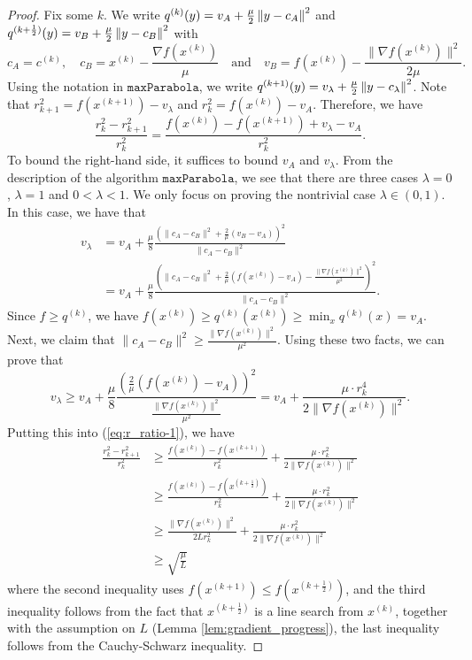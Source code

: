 \begin{proof}
Fix some $k$. We write $q^{(k)}(y)=v_{A}+\frac{\mu}{2}\left\Vert y-c_{A}\right\Vert^{2}$
and $q^{(k+\frac{1}{2})}(y)=v_{B}+\frac{\mu}{2}\left\Vert y-c_{B}\right\Vert^{2}$
with
\[
c_{A}=c^{(k)},\quad c_{B}=x^{(k)}-\frac{\nabla f(x^{(k)})}{\mu}\quad\text{and}\quad v_{B}=f(x^{(k)})-\frac{\|\nabla f(x^{(k)})\|^{2}}{2\mu}.
\]
Using the notation in $\mathtt{maxParabola}$, we write $q^{(k+1)}(y)=v_{\lambda}+\frac{\mu}{2}\left\Vert y-c_{\lambda}\right\Vert^{2}$.
Note that $r^{2}_{k+1}=f(x^{(k+1)})-v_{\lambda}$ and $r^{2}_{k}=f(x^{(k)})-v_{A}$.
Therefore, we have
\begin{equation}
\frac{r^{2}_{k}-r^{2}_{k+1}}{r^{2}_{k}}=\frac{f(x^{(k)})-f(x^{(k+1)})+v_{\lambda}-v_{A}}{r^{2}_{k}}.\label{eq:r_ratio-1}
\end{equation}
To bound the right-hand side, it suffices to bound $v_{A}$ and $v_{\lambda}$.
From the description of the algorithm $\mathtt{maxParabola}$, we
see that there are three cases $\lambda=0$, $\lambda=1$ and $0<\lambda<1$.
We only focus on proving the nontrivial case $\lambda\in(0,1)$. 
In this case, we have that
\begin{align*}
v_{\lambda} & =v_{A}+\frac{\mu}{8}\frac{(\|c_{A}-c_{B}\|^{2}+\frac{2}{\mu}(v_{B}-v_{A}))^{2}}{\|c_{A}-c_{B}\|^{2}}\\
 & =v_{A}+\frac{\mu}{8}\frac{(\|c_{A}-c_{B}\|^{2}+\frac{2}{\mu}(f(x^{(k)})-v_{A})-\frac{\|\nabla f(x^{(k)})\|^{2}}{\mu^{2}})^{2}}{\|c_{A}-c_{B}\|^{2}}.
\end{align*}
Since $f\geq q^{(k)}$, we have $f(x^{(k)})\geq q^{(k)}(x^{(k)})\geq\min_{x}q^{(k)}(x)=v_{A}$.
Next, we claim that $\|c_{A}-c_{B}\|^{2}\geq\frac{\|\nabla f(x^{(k)})\|^{2}}{\mu^{2}}$.
Using these two facts, we can prove that
\[
v_{\lambda}\geq v_{A}+\frac{\mu}{8}\frac{(\frac{2}{\mu}(f(x^{(k)})-v_{A}))^{2}}{\frac{\|\nabla f(x^{(k)})\|^{2}}{\mu^{2}}}=v_{A}+\frac{\mu\cdot r^{4}_{k}}{2\|\nabla f(x^{(k)})\|^{2}}.
\]
Putting this into (\ref{eq:r_ratio-1}), we have
\begin{align}
\frac{r^{2}_{k}-r^{2}_{k+1}}{r^{2}_{k}} & \geq\frac{f(x^{(k)})-f(x^{(k+1)})}{r^{2}_{k}}+\frac{\mu\cdot r^{2}_{k}}{2\|\nabla f(x^{(k)})\|^{2}}\nonumber \\
 & \geq\frac{f(x^{(k)})-f(x^{(k+\frac{1}{2})})}{r^{2}_{k}}+\frac{\mu\cdot r^{2}_{k}}{2\|\nabla f(x^{(k)})\|^{2}}\nonumber \\
 & \geq\frac{\|\nabla f(x^{(k)})\|^{2}}{2Lr^{2}_{k}}+\frac{\mu\cdot r^{2}_{k}}{2\|\nabla f(x^{(k)})\|^{2}}\label{eq:geometric_key-1}\\
 & \geq\sqrt{\frac{\mu}{L}}\nonumber 
\end{align}
where the second inequality uses $f(x^{(k+1)})\leq f(x^{(k+\frac{1}{2})})$,
and the third inequality follows from the fact that $x^{(k+\frac{1}{2})}$
is a line search from $x^{(k)}$, together with the assumption on
$L$ (Lemma \ref{lem:gradient_progress}), the last inequality follows
from the Cauchy-Schwarz inequality.


\end{proof}
